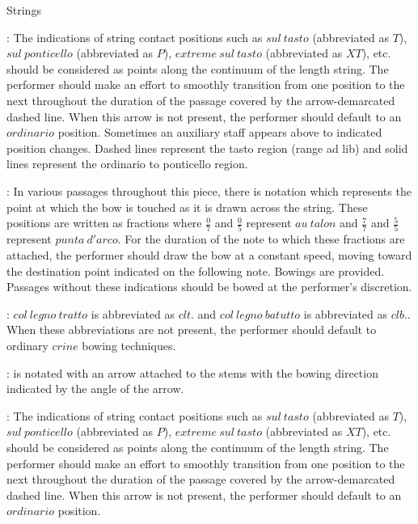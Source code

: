 \documentclass[11pt]{article}
\newcommand*\circled[1]{\tikz[baseline=(char.base)]{
            \node[shape=circle,draw,inner sep=1pt] (char) {#1};}}
\begin{document}
\begin{center}
\huge Strings
\end{center}
\begingroup
\begin{center}

 : The indications of string contact positions such as $sul \ tasto$ (abbreviated as $T$), $sul \ ponticello$ (abbreviated as $P$), $extreme \ sul \ tasto$ (abbreviated as $XT$), etc. should be considered as points along the continuum of the length string. The performer should make an effort to smoothly transition from one position to the next throughout the duration of the passage covered by the arrow-demarcated dashed line. When this arrow is not present, the performer should default to an $ordinario$ position. Sometimes an auxiliary staff appears above to indicated position changes. Dashed lines represent the tasto region (range ad lib) and solid lines represent the ordinario to ponticello region.
\rightskip\leftskip
\phantom{text} \hfill \phantom{()}

 : In various passages throughout this piece, there is notation which represents the point at which the bow is touched as it is drawn across the string. These positions are written as fractions where \( \frac{0}{7} \) and  \( \frac{0}{5} \) represent $au \ talon$ and \( \frac{7}{7} \) and \( \frac{5}{5} \) represent $punta \ d'arco$. For the duration of the note to which these fractions are attached, the performer should draw the bow at a constant speed, moving toward the destination point indicated on the following note. Bowings are provided. Passages without these indications should be bowed at the performer's discretion.
\rightskip\leftskip
\phantom{text} \hfill \phantom{()}

 : \circled{1} $col \ legno \ tratto$ is abbreviated as $clt.$ and \circled{2} $col \ legno \ batutto$ is abbreviated as $clb.$. When these abbreviations are not present, the performer should default to ordinary $crine$ bowing techniques.
\rightskip\leftskip
\phantom{text} \hfill \phantom{()}

 : is notated with an arrow attached to the stems with the bowing direction indicated by the angle of the arrow.
\rightskip\leftskip
\phantom{text} \hfill \phantom{()}

 : The indications of string contact positions such as $sul \ tasto$ (abbreviated as $T$), $sul \ ponticello$ (abbreviated as $P$), $extreme \ sul \ tasto$ (abbreviated as $XT$), etc. should be considered as points along the continuum of the length string. The performer should make an effort to smoothly transition from one position to the next throughout the duration of the passage covered by the arrow-demarcated dashed line. When this arrow is not present, the performer should default to an $ordinario$ position.
\rightskip\leftskip
\phantom{text} \hfill \phantom{()}


\end{center}
\end{document}
